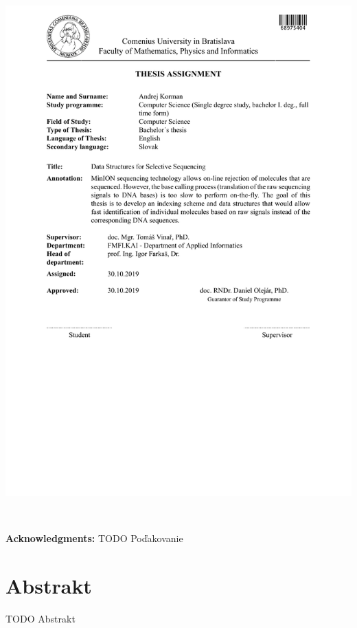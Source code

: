 \documentclass[12pt, twoside]{book}
\begin{document}
\hspace{-2cm}\includegraphics[width=1.1\textwidth]{images/zadanie-en}


\frontmatter

\setcounter{page}{3}
\newpage 
~

\vfill
{\bf Acknowledgments:} TODO Poďakovanie


\newpage 
\section*{Abstrakt}


TODO Abstrakt
\end{document}
